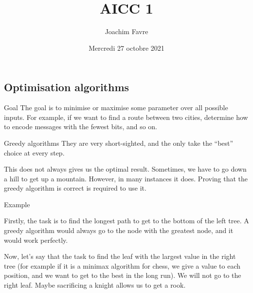 \documentclass[a4paper]{article}
\title{AICC 1}
\author{Joachim Favre}
\date{Mercredi 27 octobre 2021}
\begin{document}
\maketitle


\subsection{Optimisation algorithms}
\begin{parag}{Goal}
    The goal is to minimise or maximise some parameter over all possible inputs. For example, if we want to find a route between two cities, determine how to encode messages with the fewest bits, and so on.
\end{parag}

\begin{parag}{Greedy algorithms}
    They are very short-sighted, and the only take the ``best'' choice at every step.

    This does not always gives us the optimal result. Sometimes, we have to go down a hill to get up a mountain. However, in many instances it does. Proving that the greedy algorithm is correct is required to use it.
\end{parag}

\begin{parag}{Example}

    Firstly, the task is to find the longest path to get to the bottom of the left tree. A greedy algorithm would always go to the node with the greatest node, and it would work perfectly.

    Now, let's say that the task to find the leaf with the largest value in the right tree (for example if it is a minimax algorithm for chess, we give a value to each position, and we want to get to the best in the long run). We will not go to the right leaf. Maybe sacrificing a knight allows us to get a rook.
\end{parag}
\end{document}
